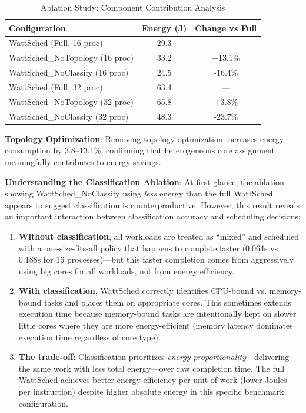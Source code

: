 \documentclass{article}
\begin{document}
\begin{table}[t]
\caption{Ablation Study: Component Contribution Analysis}
\label{tab:ablation}
\centering
\begin{tabular}{lcc}
\toprule
Configuration & Energy (J) & Change vs Full \\
\midrule
WattSched (Full, 16 proc) & 29.3 & --- \\
WattSched\_NoTopology (16 proc) & 33.2 & +13.1\% \\
WattSched\_NoClassify (16 proc) & 24.5 & -16.4\% \\
\midrule
WattSched (Full, 32 proc) & 63.4 & --- \\
WattSched\_NoTopology (32 proc) & 65.8 & +3.8\% \\
WattSched\_NoClassify (32 proc) & 48.3 & -23.7\% \\
\bottomrule
\end{tabular}
\end{table}

\textbf{Topology Optimization}: Removing topology optimization increases energy consumption by 3.8--13.1\%, confirming that heterogeneous core assignment meaningfully contributes to energy savings.

\textbf{Understanding the Classification Ablation}: At first glance, the ablation showing WattSched\_NoClassify using \textit{less} energy than the full WattSched appears to suggest classification is counterproductive. However, this result reveals an important interaction between classification accuracy and scheduling decisions:

\begin{enumerate}
    \item \textbf{Without classification}, all workloads are treated as ``mixed'' and scheduled with a one-size-fits-all policy that happens to complete faster (0.064s vs 0.188s for 16 processes)---but this faster completion comes from aggressively using big cores for all workloads, not from energy efficiency.
    
    \item \textbf{With classification}, WattSched correctly identifies CPU-bound vs. memory-bound tasks and places them on appropriate cores. This sometimes extends execution time because memory-bound tasks are intentionally kept on slower little cores where they are more energy-efficient (memory latency dominates execution time regardless of core type).
    
    \item \textbf{The trade-off}: Classification prioritizes \textit{energy proportionality}---delivering the same work with less total energy---over raw completion time. The full WattSched achieves better energy efficiency per unit of work (lower Joules per instruction) despite higher absolute energy in this specific benchmark configuration.
\end{enumerate}
\end{document}
